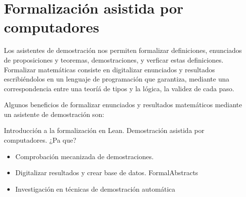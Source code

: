 \section{Formalización asistida por computadores}

Los asistentes de demostración nos permiten formalizar definiciones, enunciados
de proposiciones y teoremas, demostraciones, y verficar estas definiciones.
Formalizar matemáticas consiste en digitalizar enunciados y resultados
escribiéndolos en un lenguaje de programación que garantiza, mediante una
correspondencia entre una teoríá de tipos y la lógica, la validez de cada paso.

Algunos beneficios de formalizar enunciados y resultados matemáticos mediante un
asistente de demostración son:

Introducción a la formalización en Lean. Demostración asistida por computadores. ¿Pa que?
\begin{itemize}
	\item Comprobación mecanizada de demostraciones.
	\item Digitalizar resultados y crear base de datos.
	      FormalAbstracts
	\item Investigación en técnicas de demostración automática
\end{itemize}




